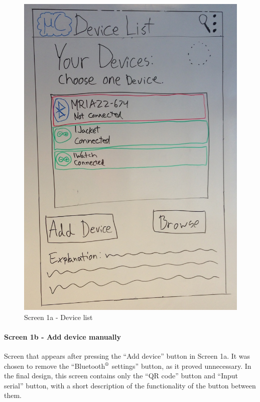 \begin{figure}[H]
	\centering
		\includegraphics[scale=0.2]{images/Design_guide/Screen1a.png}
	\caption{Screen 1a - Device list}
	\label{fig:screen1a}
\end{figure}


\paragraph{Screen 1b - Add device manually}
Screen that appears after pressing the ``Add device'' button in Screen 1a. It was chosen to remove the ``Bluetooth$\textsuperscript{\textregistered}$ settings'' button, as it proved unnecessary. In the final design, this screen contains only the ``QR code'' button and ``Input serial'' button, with a short description of the functionality of the button between them.

